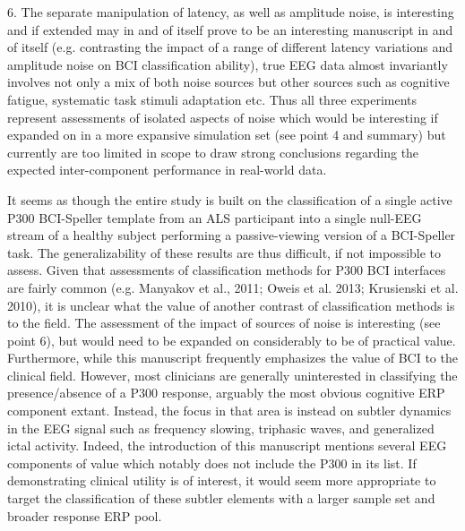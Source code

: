 \documentclass[journal,onecolumn,12pt]{IEEEtran}
\begin{document}
6. The separate manipulation of latency, as well as amplitude noise, is interesting and if extended may in and of itself prove to be an interesting manuscript in and of itself (e.g. contrasting the impact of a range of different latency variations and amplitude noise on BCI classification ability), true EEG data almost invariantly involves not only a mix of both noise sources but other sources such as cognitive fatigue, systematic task stimuli adaptation etc. Thus all three experiments represent assessments of isolated aspects of noise which would be interesting if expanded on in a more expansive simulation set (see point 4 and summary) but currently are too limited in scope to draw strong conclusions regarding the expected inter-component performance in real-world data.

It seems as though the entire study is built on the classification of a single active P300 BCI-Speller template from an ALS participant into a single null-EEG stream of a healthy subject performing a passive-viewing version of a BCI-Speller task. The generalizability of these results are thus difficult, if not impossible to assess. Given that assessments of classification methods for P300 BCI interfaces are fairly common (e.g. Manyakov et al., 2011; Oweis et al. 2013; Krusienski et al. 2010), it is unclear what the value of another contrast of classification methods is to the field. The assessment of the impact of sources of noise is interesting (see point 6), but would need to be expanded on considerably to be of practical value. Furthermore, while this manuscript frequently emphasizes the value of BCI to the clinical field. However, most clinicians are generally uninterested in classifying the presence/absence of a P300 response, arguably the most obvious cognitive ERP component extant. Instead, the focus in that area is instead on subtler dynamics in the EEG signal such as frequency slowing, triphasic waves, and generalized ictal activity. Indeed, the introduction of this manuscript mentions several EEG components of value which notably does not include the P300 in its list. If demonstrating clinical utility is of interest, it would seem more appropriate to target the classification of these subtler elements with a larger sample set and broader response ERP pool.
\end{document}

